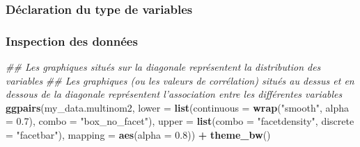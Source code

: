 \documentclass[
]{book}
\newenvironment{Shaded}{\begin{snugshade}}{\end{snugshade}}
\newcommand{\CommentTok}[1]{\textcolor[rgb]{0.56,0.35,0.01}{\textit{#1}}}
\newcommand{\DataTypeTok}[1]{\textcolor[rgb]{0.13,0.29,0.53}{#1}}
\newcommand{\FloatTok}[1]{\textcolor[rgb]{0.00,0.00,0.81}{#1}}
\newcommand{\KeywordTok}[1]{\textcolor[rgb]{0.13,0.29,0.53}{\textbf{#1}}}
\newcommand{\NormalTok}[1]{#1}
\newcommand{\OperatorTok}[1]{\textcolor[rgb]{0.81,0.36,0.00}{\textbf{#1}}}
\newcommand{\StringTok}[1]{\textcolor[rgb]{0.31,0.60,0.02}{#1}}
\begin{document}
\hypertarget{duxe9claration-du-type-de-variables-13}{%
\subsubsection{Déclaration du type de variables}\label{duxe9claration-du-type-de-variables-13}}

\begin{Shaded}
\end{Shaded}

\hypertarget{inspection-des-donnuxe9es-13}{%
\subsubsection{Inspection des données}\label{inspection-des-donnuxe9es-13}}

\begin{Shaded}
\begin{Highlighting}[]
\CommentTok{## Les graphiques situés sur la diagonale représentent la distribution des variables}
\CommentTok{## Les graphiques (ou les valeurs de corrélation) situés au dessus et en dessous de la diagonale représentent l'association entre les différentes variables}
\KeywordTok{ggpairs}\NormalTok{(my_data.multinom2,}
        \DataTypeTok{lower =} \KeywordTok{list}\NormalTok{(}\DataTypeTok{continuous =} \KeywordTok{wrap}\NormalTok{(}\StringTok{"smooth"}\NormalTok{, }\DataTypeTok{alpha =} \FloatTok{0.7}\NormalTok{), }\DataTypeTok{combo =} \StringTok{"box_no_facet"}\NormalTok{),}
        \DataTypeTok{upper =} \KeywordTok{list}\NormalTok{(}\DataTypeTok{combo =} \StringTok{"facetdensity"}\NormalTok{, }\DataTypeTok{discrete =} \StringTok{"facetbar"}\NormalTok{), }
        \DataTypeTok{mapping =} \KeywordTok{aes}\NormalTok{(}\DataTypeTok{alpha =} \FloatTok{0.8}\NormalTok{)) }\OperatorTok{+}\StringTok{ }\KeywordTok{theme_bw}\NormalTok{()}
\end{Highlighting}
\end{Shaded}
\end{document}
